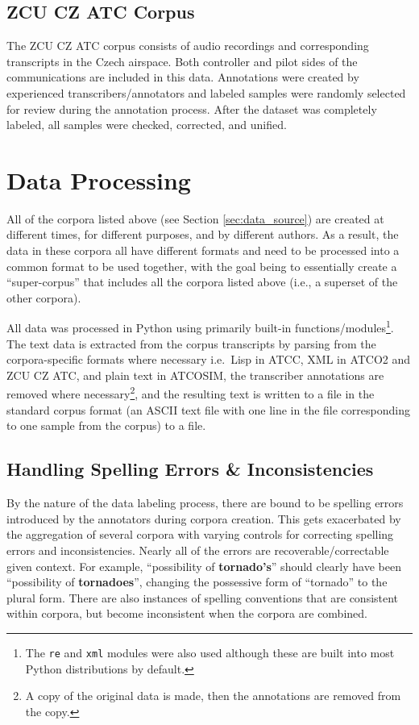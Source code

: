 \documentclass[12pt]{article}
\begin{document}
\subsection{ZCU CZ ATC Corpus}\label{sec:zcu_atc}
The ZCU CZ ATC corpus consists of audio recordings and corresponding transcripts in the Czech airspace. Both controller and pilot sides of the
communications are included in this data. Annotations were created by experienced transcribers/annotators and labeled samples were randomly selected
for review during the annotation process. After the dataset was completely labeled, all samples were checked, corrected, and
unified\cite{smidl_air_2019}.

\section{Data Processing}\label{sec:data_processing}
All of the corpora listed above (see Section \ref{sec:data_source}) are created at different times, for different purposes, and by different authors.
As a result, the data in these corpora all have different formats and need to be processed into a common format to be used together, with the goal
being to essentially create a ``super-corpus'' that includes all the corpora listed above (i.e., a superset of the other corpora).

All data was processed in Python using primarily built-in functions/modules\footnote{The \lstinline|re| and \lstinline|xml| modules were also used
    although these are built into most Python distributions by default.}. The text data is extracted from the corpus transcripts by parsing from the
corpora-specific formats where necessary i.e.~Lisp in ATCC, XML in ATCO2 and ZCU CZ ATC, and plain text in ATCOSIM, the transcriber annotations
are removed where necessary\footnote{A copy of the original data is made, then the annotations are removed from the copy.}, and the resulting text
is written to a file in the standard corpus format (an ASCII text file with one line in the file corresponding to one sample from the corpus) to a
file.

\subsection{Handling Spelling Errors \& Inconsistencies}\label{sec:spelling_errors}
By the nature of the data labeling process, there are bound to be spelling errors introduced by the annotators during corpora creation. This gets
exacerbated by the aggregation of several corpora with varying controls for correcting spelling errors and inconsistencies. Nearly all of the errors
are recoverable/correctable given context. For example, ``possibility of \textbf{tornado's}'' should clearly have been ``possibility of
\textbf{tornadoes}'', changing the possessive form of ``tornado'' to the plural form. There are also instances of spelling conventions that are
consistent within corpora, but become inconsistent when the corpora are combined.
\end{document}
